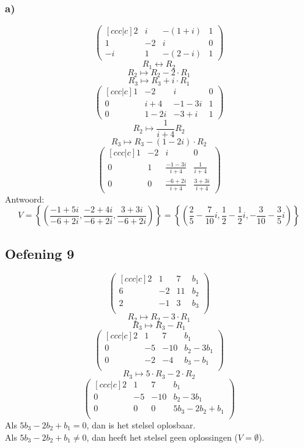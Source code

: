 \documentclass[lineaire_algebra_oplossingen.tex]{subfiles}
\begin{document}
\subsubsection*{a)}
\[
\begin{pmatrix}[ccc|c]
2 &  i &  -(1+i) & 1 \\
1 &  -2 &  i & 0 \\
-i &  1 &  -(2-i) & 1
\end{pmatrix}
\]
\[ R_1 \leftrightarrow R_2\]
\[ R_2 \longmapsto R_2 -2\cdot R_1\]
\[ R_3 \longmapsto R_3 +i\cdot R_1\]
\[
\begin{pmatrix}[ccc|c]
1 &  -2 &  i & 0 \\
0 &  i+4 &  -1-3i & 1 \\
0 &  1-2i &  -3+i & 1
\end{pmatrix}
\]
\[ R_2 \longmapsto \frac{1}{i+4} R_2 \]
\[ R_3 \longmapsto R_3 -(1-2i)\cdot R_2\]
\[
\begin{pmatrix}[ccc|c]
1 &  -2 &  i & 0 \\
0 &  1 &  \frac{-1-3i}{i+4} & \frac{1}{i+4} \\
0 &  0 &  \frac{-6+2i}{i+4} & \frac{3+3i}{i+4} 
\end{pmatrix}
\]
Antwoord:
\[
V = \left\{\left( \frac{-1+5i}{-6+2i} , \frac{-2+4i}{-6+2i} , \frac{3+3i}{-6+2i} \right)\right\} = \left\{\left( \frac{2}{5} - \frac{7}{10}i , \frac{1}{2} - \frac{1}{2}i , -\frac{3}{10} - \frac{3}{5}i \right)\right\}
\]

\subsection{Oefening 9}
\[
\begin{pmatrix}[ccc|c]
2 &  1 &  7 & b_1\\
6 & -2 & 11 & b_2 \\
2 & -1 &  3 & b_3\\
\end{pmatrix}
\]
\[ R_2 \longmapsto R_2 -3\cdot R_1\]
\[ R_3 \longmapsto R_3 - R_1\]
\[
\begin{pmatrix}[ccc|c]
2 &  1 &  7 & b_1\\
0 & -5 & -10& b_2-3b_1 \\
0 & -2 &  -4& b_3-b_1\\
\end{pmatrix}
\]
\[ R_3 \longmapsto 5 \cdot R_3 - 2 \cdot R_2\]
\[
\begin{pmatrix}[ccc|c]
2 &  1 &  7 & b_1\\
0 & -5 & -10& b_2-3b_1 \\
0 & 0  &  0 & 5b_3-2b_2+b_1\\
\end{pmatrix}
\]
Als $5b_3-2b_2+b_1 = 0$, dan is het stelsel oplosbaar.\\
Als $5b_3-2b_2+b_1 \neq 0$, dan heeft het stelsel geen oplossingen ($V=\emptyset$).
\end{document}
